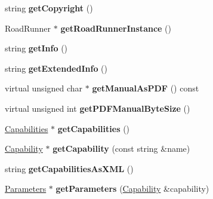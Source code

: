 \begin{DoxyCompactItemize}
\item 
\hypertarget{classrrp_1_1_plugin_a809f7fd215a07da3ed46285839b6d3b3}{string {\bfseries get\-Copyright} ()}\label{classrrp_1_1_plugin_a809f7fd215a07da3ed46285839b6d3b3}

\item 
\hypertarget{classrrp_1_1_plugin_a6030298fc6c78429834bf07a0d1da8d6}{Road\-Runner $\ast$ {\bfseries get\-Road\-Runner\-Instance} ()}\label{classrrp_1_1_plugin_a6030298fc6c78429834bf07a0d1da8d6}

\item 
\hypertarget{classrrp_1_1_plugin_a81d3a928d80c655f8462dd1f17196ae3}{string {\bfseries get\-Info} ()}\label{classrrp_1_1_plugin_a81d3a928d80c655f8462dd1f17196ae3}

\item 
\hypertarget{classrrp_1_1_plugin_adbc8b3240248b1194bf10279925f2dac}{string {\bfseries get\-Extended\-Info} ()}\label{classrrp_1_1_plugin_adbc8b3240248b1194bf10279925f2dac}

\item 
\hypertarget{classrrp_1_1_plugin_adc22fa43da7d8666df40dd0e9573ca5e}{virtual unsigned char $\ast$ {\bfseries get\-Manual\-As\-P\-D\-F} () const }\label{classrrp_1_1_plugin_adc22fa43da7d8666df40dd0e9573ca5e}

\item 
\hypertarget{classrrp_1_1_plugin_a4664ef583d6428a9b2e40ac854a17e42}{virtual unsigned int {\bfseries get\-P\-D\-F\-Manual\-Byte\-Size} ()}\label{classrrp_1_1_plugin_a4664ef583d6428a9b2e40ac854a17e42}

\item 
\hypertarget{classrrp_1_1_plugin_afdfde369f51494d0addf2fdbe9be79fb}{\hyperlink{classrrp_1_1_capabilities}{Capabilities} $\ast$ {\bfseries get\-Capabilities} ()}\label{classrrp_1_1_plugin_afdfde369f51494d0addf2fdbe9be79fb}

\item 
\hypertarget{classrrp_1_1_plugin_a716184dba55ab9dee98b3230a21ec407}{\hyperlink{classrrp_1_1_capability}{Capability} $\ast$ {\bfseries get\-Capability} (const string \&name)}\label{classrrp_1_1_plugin_a716184dba55ab9dee98b3230a21ec407}

\item 
\hypertarget{classrrp_1_1_plugin_af4e665e2bc4da266711c1711e0f65066}{string {\bfseries get\-Capabilities\-As\-X\-M\-L} ()}\label{classrrp_1_1_plugin_af4e665e2bc4da266711c1711e0f65066}

\item 
\hypertarget{classrrp_1_1_plugin_a428b33636275d182dec3988be4a1e491}{\hyperlink{classrrp_1_1_parameters}{Parameters} $\ast$ {\bfseries get\-Parameters} (\hyperlink{classrrp_1_1_capability}{Capability} \&capability)}\label{classrrp_1_1_plugin_a428b33636275d182dec3988be4a1e491}


\end{DoxyCompactItemize}
